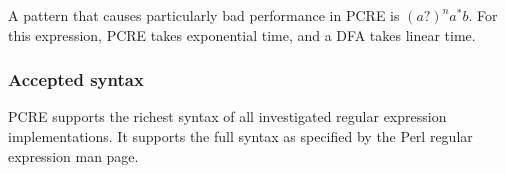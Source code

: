 A pattern that causes particularly bad performance in PCRE is $(a?)^na^*b$. For
this expression, PCRE takes exponential time, and a DFA takes linear time.


\subsubsection{Accepted syntax}

PCRE supports the richest syntax of all investigated regular expression
implementations. It supports the full syntax as specified by the Perl regular
expression man page.


